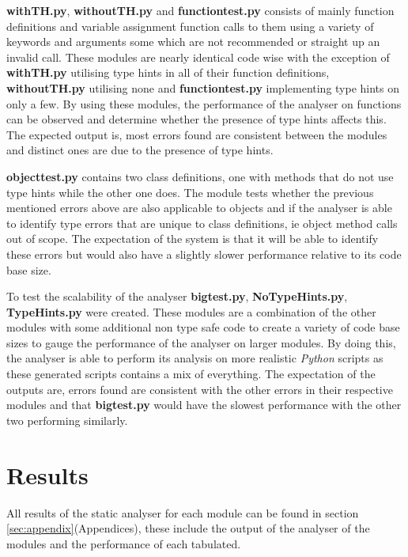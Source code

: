 \documentclass{l4proj}
\begin{document}
\textbf{withTH.py}, \textbf{withoutTH.py} and \textbf{function\textunderscore test.py} consists of mainly function definitions and variable assignment function calls to them using a variety of keywords and arguments some which are not recommended or straight up an invalid call. These modules are nearly identical code wise with the exception of \textbf{withTH.py} utilising type hints in all of their function definitions, \textbf{withoutTH.py} utilising none and \textbf{function\textunderscore test.py} implementing type hints on only a few. By using these modules, the performance of the analyser on functions can be observed and determine whether the presence of type hints affects this. The expected output is, most errors found are consistent between the modules and distinct ones are due to the presence of type hints. 

\textbf{object\textunderscore test.py} contains two class definitions, one with methods that do not use type hints while the other one does. The module tests whether the previous mentioned errors above are also applicable to objects and if the analyser is able to identify type errors that are unique to class definitions, ie object method calls out of scope. The expectation of the system is that it will be able to identify these errors but would also have a slightly slower performance relative to its code base size.

To test the scalability of the analyser \textbf{big\textunderscore test.py}, \textbf{NoTypeHints.py}, \textbf{TypeHints.py} were created. These modules are a combination of the other modules with some additional non type safe code to create a variety of code base sizes to gauge the performance of the analyser on larger modules. By doing this, the analyser is able to perform its analysis on more realistic \emph{Python} scripts as these generated scripts contains a mix of everything. The expectation of the outputs are, errors found are consistent with the other errors in their respective modules and that \textbf{big\textunderscore test.py} would have the slowest performance with the other two performing similarly. 

\clearpage
\section{Results}
All results of the static analyser for each module can be found in section \ref{sec:appendix}(Appendices), these include the output of the analyser of the modules and the performance of each tabulated.  
\end{document}
